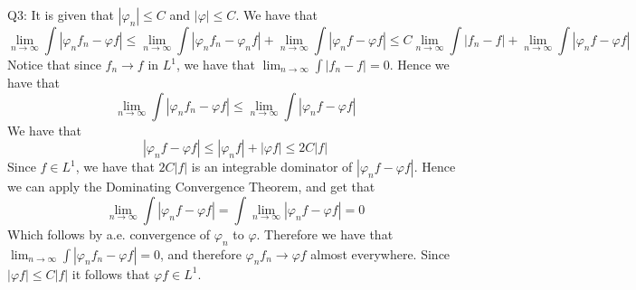 \documentclass[letterpaper]{article}
\begin{document}
\noindent
Q3: It is given that $|\varphi_n|\leq C$ and $|\varphi|\leq C$. We have that $$\lim_{n\to \infty }\int |\varphi_n f_n - \varphi f| \leq \lim_{n\to \infty} \int |\varphi_n f_n - \varphi_n f| + \lim_{n \to \infty} \int |\varphi_n f - \varphi f| \leq C \lim_{n\to \infty} \int |f_n-f| + \lim_{n\to \infty} \int |\varphi_n f - \varphi f| $$ 
Notice that since $f_n\to f$ in $L^1$, we have that $\lim_{n\to \infty} \int |f_n-f| =0$. Hence we have that $$\lim_{n\to \infty} \int |\varphi_n f_n - \varphi f| \leq \lim_{n\to \infty } \int |\varphi_n f - \varphi f|$$ We have that $$|\varphi_n f - \varphi f| \leq |\varphi_n f| + |\varphi f| \leq 2C|f|$$
Since $f\in L^1$, we have that $2C|f|$ is an integrable dominator of $|\varphi_n f - \varphi f|$. Hence we can apply the Dominating Convergence Theorem, and get that $$\lim_{n\to \infty} \int |\varphi_n f - \varphi f| = \int \lim_{n\to \infty } |\varphi_n f - \varphi f| = 0 $$
Which follows by a.e. convergence of $\varphi_n$ to $\varphi$.  Therefore we have that $\lim_{n \to \infty} \int |\varphi_n f_n - \varphi f| =0$, and therefore $\varphi_n f_n \to \varphi f $ almost everywhere. Since $|\varphi f| \leq C |f|$ it follows that $\varphi f\in L^1$. 
\end{document}

